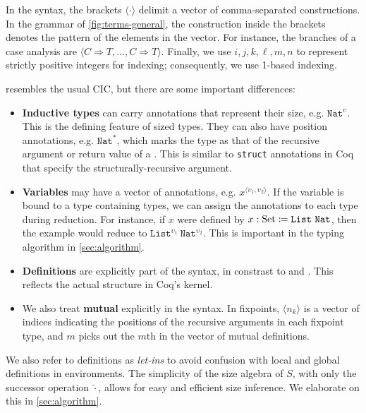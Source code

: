 \documentclass[acmsmall,screen,review,10pt]{acmart} %
\begin{document}
In the syntax, the brackets $\langle \cdot \rangle$ delimit a vector of comma-separated constructions. In the grammar of \autoref{fig:terms-general}, the construction inside the brackets denotes the pattern of the elements in the vector. For instance, the branches of a case analysis are $\langle C \Rightarrow T, \dots, C \Rightarrow T \rangle$. Finally, we use $i, j, k, \ell, m, n$ to represent strictly positive integers for indexing; consequently, we use 1-based indexing.

\lang resembles the usual CIC, but there are some important differences:

\begin{itemize}
    \item \textbf{Inductive types} can carry annotations that represent their size, e.g. $\texttt{Nat}^\upsilon$. This is the defining feature of sized types. They can also have position annotations, e.g. $\texttt{Nat}^*$, which marks the type as that of the recursive argument or return value of a \cofixpoint. This is similar to \texttt{struct} annotations in Coq that specify the structurally-recursive argument.
    \item \textbf{Variables} may have a vector of annotations, e.g. $x^{\langle \upsilon_1, \upsilon_2 \rangle}$. If the variable is bound to a type containing \coinductive types, we can assign the annotations to each \coinductive type during reduction. For instance, if $x$ were defined by $x : \text{Set} \coloneqq \texttt{List}\ \texttt{Nat}$, then the example would reduce to $\texttt{List}^{\upsilon_1}\ \texttt{Nat}^{\upsilon_2}$. This is important in the typing algorithm in \autoref{sec:algorithm}.
    \item \textbf{Definitions} are explicitly part of the syntax, in constrast to \CIChat and \CIChatbar \cite{cic-hat-bar}. This reflects the actual structure in Coq's kernel.
    \item We also treat \textbf{mutual \cofixpoints} explicitly in the syntax. In fixpoints, $\langle n_k \rangle$ is a vector of indices indicating the positions of the recursive arguments in each fixpoint type, and $m$ picks out the $m$th \cofixpoint in the vector of mutual definitions.
\end{itemize}

We also refer to definitions as \textit{let-ins} to avoid confusion with local and global definitions in environments. The simplicity of the size algebra of $S$, with only the successor operation $\widehat{\cdot}$, allows for easy and efficient size inference. We elaborate on this in \autoref{sec:algorithm}.
\end{document}
